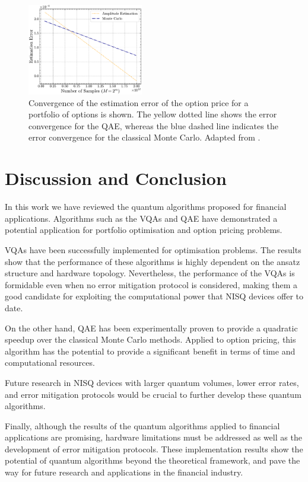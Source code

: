 \documentclass[prx,twocolumn,floatfix,superscriptaddress,longbibliography]{revtex4-1}
\begin{document}
\begin{figure}[h!]
\centering
\includegraphics[width=0.45\textwidth]{estimation-error.pdf}
  \caption{\label{fig:portfolio-option} 
Convergence of the estimation error of the option price for a portfolio of options is shown. The yellow dotted line shows the error convergence for the QAE, whereas the blue dashed line indicates the error convergence for the classical Monte Carlo. Adapted  from \cite{Stamatopoulos2020}.}
\end{figure}

\section{Discussion and Conclusion}\label{sec:discussion}
In this work we have reviewed the quantum algorithms proposed for financial applications. Algorithms such as the VQAs and QAE have demonstrated a potential application for portfolio optimisation and option pricing problems. 

VQAs have been successfully implemented for optimisation problems. The results show that the performance of these algorithms is highly dependent on the ansatz structure and hardware topology. Nevertheless, the performance of the VQAs is formidable even when no error mitigation protocol is considered, making them a good candidate for exploiting the computational power that NISQ devices offer to date.  

On the other hand, QAE has been experimentally proven to provide a quadratic speedup over the classical Monte Carlo methods. Applied to 
option pricing, this algorithm has the potential to provide a significant benefit in terms of time and computational 
resources.

Future research in NISQ devices with larger quantum volumes, lower error rates, and error mitigation protocols would be crucial 
to further develop these quantum algorithms. 

Finally, although the results of the quantum algorithms applied to financial applications are promising, 
hardware limitations must be addressed as well as the development of error mitigation protocols. These  implementation results 
show the potential of quantum algorithms beyond the theoretical framework, and pave the way for future research and 
applications in the financial industry.

\FloatBarrier


\end{document}
